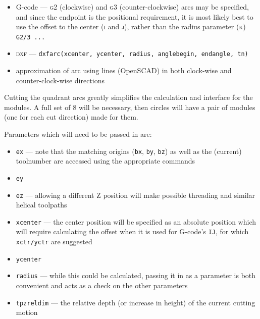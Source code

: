 \documentclass{ltxdoc}
\begin{document}
\begin{itemize}
\item G-code --- \textsc{g2} (clockwise) and \textsc{g3} (counter-clockwise) arcs may be specified, 
      and since the endpoint is the positional requirement, it is most likely best to use the offset 
      to the center (\textsc{i} and \textsc{j}), rather than the radius parameter (\textsc{k}) 
      \texttt{G2/3 ...} 
\item \textsc{dxf} --- \texttt{dxfarc(xcenter, ycenter, radius, anglebegin, endangle, tn)}
\item approximation of arc using lines (OpenSCAD) in both clock-wise and counter-clock-wise directions
\end{itemize}
 
Cutting the quadrant arcs greatly simplifies the calculation and interface for the modules. A full set of 8 will be necessary, then circles will have a pair of modules (one for each cut direction) made for them.
 

Parameters which will need to be passed in are:
 
\begin{itemize}
 \item \texttt{ex} --- note that the matching origins (\verb|bx|, \verb|by|, \verb|bz|) as well as 
                       the (current) toolnumber are accessed using the appropriate commands
 \item \texttt{ey}
 \item \texttt{ez} --- allowing a different Z position will make possible threading and
                       similar helical toolpaths
\item \texttt{xcenter} --- the center position will be specified as an absolute position
      which will require calculating the offset when it is used for G-code's \texttt{IJ}, 
      for which \texttt{xctr/yctr} are suggested 
\item \texttt{ycenter}
\item \texttt{radius} --- while this could be calculated, passing it in as a parameter
      is both convenient and acts as a check on the other parameters
\item \texttt{tpzreldim} --- the relative depth (or increase in height) of the current cutting motion
\end{itemize}
\end{document}
